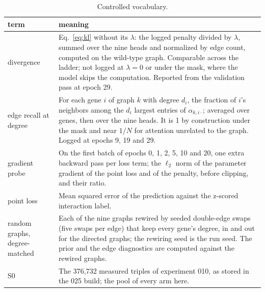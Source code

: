 \begin{table}[htbp]
\centering
\footnotesize
\caption{Controlled vocabulary.}
\label{tab:vocab}
\begin{tabular}{p{3.2cm}p{13.6cm}}
\toprule
term & meaning \\
\midrule
divergence & Eq.~\ref{eq:kl} without its $\lambda$: the logged penalty divided by $\lambda$, summed over the nine heads and normalized by edge count, computed on the wild-type graph. Comparable across the ladder; not logged at $\lambda = 0$ or under the mask, where the model skips the computation. Reported from the validation pass at epoch 29. \\
edge recall at degree & For each gene $i$ of graph $k$ with degree $d_i$, the fraction of $i$'s neighbors among the $d_i$ largest entries of $\alpha_{k,i\cdot}$; averaged over genes, then over the nine heads. It is 1 by construction under the mask and near $1/N$ for attention unrelated to the graph. Logged at epochs 9, 19 and 29. \\
gradient probe & On the first batch of epochs 0, 1, 2, 5, 10 and 20, one extra backward pass per loss term; the $\ell_2$ norm of the parameter gradient of the point loss and of the penalty, before clipping, and their ratio. \\
point loss & Mean squared error of the prediction against the z-scored interaction label. \\
random graphs, degree-matched & Each of the nine graphs rewired by seeded double-edge swaps (five swaps per edge) that keep every gene's degree, in and out for the directed graphs; the rewiring seed is the run seed. The prior and the edge diagnostics are computed against the rewired graphs. \\
S0 & The 376{,}732 measured triples of experiment 010, as stored in the 025 build; the pool of every arm here. \\
\bottomrule
\end{tabular}
\end{table}
